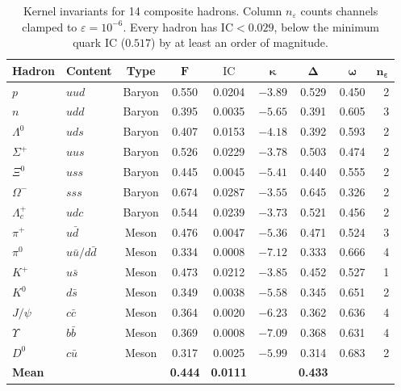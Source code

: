 \documentclass[11pt,a4paper]{article}
\theoremstyle{plain}
\theoremstyle{definition}
\theoremstyle{remark}
\newcommand{\eps}{\varepsilon}
\newcommand{\IC}{\mathrm{IC}}
\begin{document}
\begin{table}[H]
\caption{Kernel invariants for 14 composite hadrons.
Column $n_\eps$ counts channels clamped to $\eps = 10^{-6}$.
\textcolor{CliffRed}{Every hadron has $\IC < 0.029$}, below the
minimum quark $\IC$ ($0.517$) by at least an order of magnitude.}
\label{tab:hadrons}
\centering\small
\begin{tabular}{@{}llccccccr@{}}
\toprule
\textbf{Hadron} & \textbf{Content} & \textbf{Type} &
  $\bm{F}$ & $\bm{\IC}$ & $\bm{\kappa}$ & $\bm{\Delta}$ &
  $\bm{\omega}$ & $\bm{n_\eps}$ \\
\midrule
$p$             & $uud$                    & Baryon & 0.550 & 0.0204 & $-3.89$ & 0.529 & 0.450 & 2 \\
$n$             & $udd$                    & Baryon & 0.395 & 0.0035 & $-5.65$ & 0.391 & 0.605 & 3 \\
$\Lambda^0$     & $uds$                    & Baryon & 0.407 & 0.0153 & $-4.18$ & 0.392 & 0.593 & 2 \\
$\Sigma^+$      & $uus$                    & Baryon & 0.526 & 0.0229 & $-3.78$ & 0.503 & 0.474 & 2 \\
$\Xi^0$         & $uss$                    & Baryon & 0.445 & 0.0045 & $-5.41$ & 0.440 & 0.555 & 2 \\
$\Omega^-$      & $sss$                    & Baryon & 0.674 & 0.0287 & $-3.55$ & 0.645 & 0.326 & 2 \\
$\Lambda_c^+$   & $udc$                    & Baryon & 0.544 & 0.0239 & $-3.73$ & 0.521 & 0.456 & 2 \\
\midrule
$\pi^+$         & $u\bar{d}$               & Meson  & 0.476 & 0.0047 & $-5.36$ & 0.471 & 0.524 & 3 \\
$\pi^0$         & $u\bar{u}/d\bar{d}$      & Meson  & 0.334 & 0.0008 & $-7.12$ & 0.333 & 0.666 & 4 \\
$K^+$           & $u\bar{s}$               & Meson  & 0.473 & 0.0212 & $-3.85$ & 0.452 & 0.527 & 1 \\
$K^0$           & $d\bar{s}$               & Meson  & 0.349 & 0.0038 & $-5.58$ & 0.345 & 0.651 & 2 \\
$J/\psi$        & $c\bar{c}$               & Meson  & 0.364 & 0.0020 & $-6.23$ & 0.362 & 0.636 & 4 \\
$\Upsilon$      & $b\bar{b}$               & Meson  & 0.369 & 0.0008 & $-7.09$ & 0.368 & 0.631 & 4 \\
$D^0$           & $c\bar{u}$               & Meson  & 0.317 & 0.0025 & $-5.99$ & 0.314 & 0.683 & 2 \\
\midrule
\textbf{Mean}   &                          &        & \textbf{0.444} & \textbf{0.0111} &
  & \textbf{0.433} & & \\
\bottomrule
\end{tabular}
\end{table}
\end{document}
